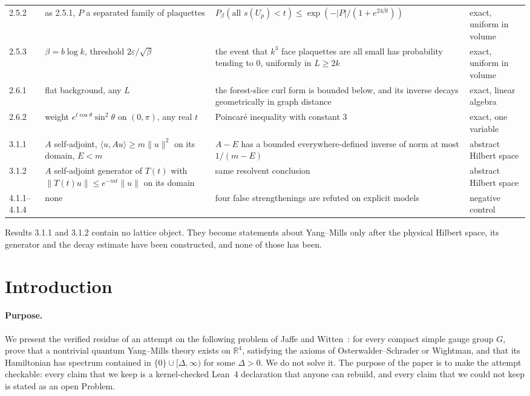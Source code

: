 \documentclass[11pt]{article}
\numberwithin{equation}{subsection}
\theoremstyle{plain}
\theoremstyle{definition}
\newcommand{\R}{\mathbb{R}}
\begin{document}
{\begin{longtable}{@{}>{\raggedright}p{}>{\raggedright}p{}>{\raggedright}p{}>{\raggedright\arraybackslash}p{}@{}}
2.5.2 & as 2.5.1, $P$ a separated family of plaquettes & $P_\beta(\text{all } s(U_p)<t)\le\exp(-|P|/(1+e^{24\beta t}))$ & exact, uniform in volume \\
2.5.3 & $\beta=b\log k$, threshold $2\varepsilon/\sqrt\beta$ & the event that $k^3$ face plaquettes are all small has probability tending to $0$, uniformly in $L\ge 2k$ & exact, uniform in volume \\
2.6.1 & flat background, any $L$ & the forest-slice curl form is bounded below, and its inverse decays geometrically in graph distance & exact, linear algebra \\
2.6.2 & weight $e^{t\cos\theta}\sin^2\theta$ on $(0,\pi)$, any real $t$ & Poincar\'e inequality with constant $3$ & exact, one variable \\
3.1.1 & $A$ self-adjoint, $\langle u,Au\rangle\ge m\|u\|^2$ on its domain, $E<m$ & $A-E$ has a bounded everywhere-defined inverse of norm at most $1/(m-E)$ & abstract Hilbert space \\
3.1.2 & $A$ self-adjoint generator of $T(t)$ with $\|T(t)u\|\le e^{-mt}\|u\|$ on its domain & same resolvent conclusion & abstract Hilbert space \\
4.1.1--4.1.4 & none & four false strengthenings are refuted on explicit models & negative control \\
\bottomrule
\end{longtable}}

\noindent Results 3.1.1 and 3.1.2 contain no lattice object. They become statements about
Yang--Mills only after the physical Hilbert space, its generator and the decay estimate have
been constructed, and none of those has been.

\section*{Introduction}

\paragraph{Purpose.} We present the verified residue of an attempt on the following problem
of Jaffe and Witten~\cite{JaffeWitten}: for every compact simple gauge group $G$, prove that a
nontrivial quantum Yang--Mills theory exists on $\R^4$, satisfying the axioms of
Osterwalder--Schrader or Wightman, and that its Hamiltonian has spectrum contained in
$\{0\}\cup[\Delta,\infty)$ for some $\Delta>0$. We do not solve it. The purpose of the paper is to
make the attempt checkable: every claim that we keep is a kernel-checked Lean~4 declaration
that anyone can rebuild, and every claim that we could not keep is stated as an open Problem.
\end{document}
